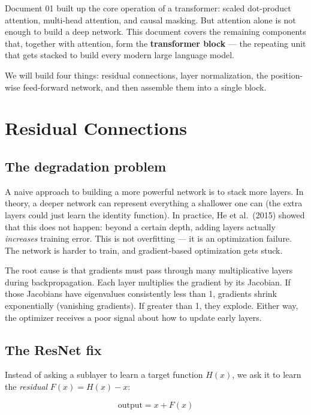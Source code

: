 


Document 01 built up the core operation of a transformer: scaled dot-product attention, multi-head attention, and causal masking. But attention alone is not enough to build a deep network. This document covers the remaining components that, together with attention, form the \textbf{transformer block} --- the repeating unit that gets stacked to build every modern large language model.

We will build four things: residual connections, layer normalization, the position-wise feed-forward network, and then assemble them into a single block.

\section{Residual Connections}

\subsection{The degradation problem}

A naive approach to building a more powerful network is to stack more layers. In theory, a deeper network can represent everything a shallower one can (the extra layers could just learn the identity function). In practice, He et al.\ (2015) showed that this does not happen: beyond a certain depth, adding layers actually \textit{increases} training error. This is not overfitting --- it is an optimization failure. The network is harder to train, and gradient-based optimization gets stuck.

The root cause is that gradients must pass through many multiplicative layers during backpropagation. Each layer multiplies the gradient by its Jacobian. If those Jacobians have eigenvalues consistently less than 1, gradients shrink exponentially (vanishing gradients). If greater than 1, they explode. Either way, the optimizer receives a poor signal about how to update early layers.

\subsection{The ResNet fix}

Instead of asking a sublayer to learn a target function $H(x)$, we ask it to learn the \textit{residual} $F(x) = H(x) - x$:

\[
\text{output} = x + F(x)
\]

